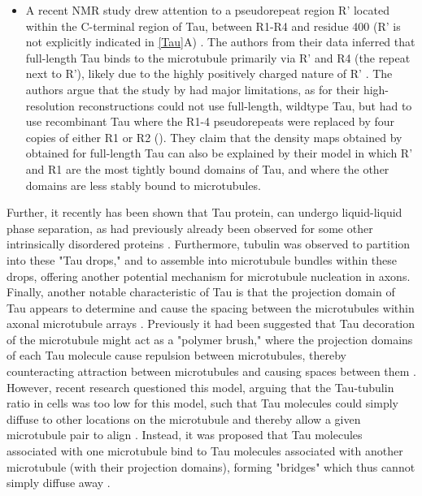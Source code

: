 \begin{itemize}
	\item A recent NMR study drew attention to a pseudorepeat region R' located within the C-terminal region of Tau, between R1-R4 and residue 400 (R' is not explicitly indicated in \autoref{Tau}A) . The authors from their data inferred that full-length Tau binds to the microtubule primarily via R' and R4 (the repeat next to R'), likely due to the highly positively charged nature of R' .  The authors argue that the study by \cite{Kellogg2018} had major limitations, as \cite{Kellogg2018} for their high-resolution reconstructions could not use full-length, wildtype Tau, but had to use recombinant Tau where the R1-4 pseudorepeats were replaced by four copies of either R1 or R2 (\cite{Kellogg2018}). They claim that the density maps obtained by \cite{Kellogg2018} obtained for full-length Tau can also be explained by their model in which R' and R1 are the most tightly bound domains of Tau, and where the other domains are less stably bound to microtubules.
\end{itemize}

Further, it recently has been shown that Tau protein, can undergo liquid-liquid phase separation, as had previously already been observed for some other intrinsically disordered proteins . Furthermore, tubulin was observed to partition into these "Tau drops," and to assemble into microtubule bundles within these drops, offering another potential mechanism for microtubule nucleation in axons. Finally, another notable characteristic of Tau is that the projection domain of Tau appears to determine and cause the spacing between the microtubules within axonal microtubule arrays \parencite{Chen1992}. Previously it had been suggested that Tau decoration of the microtubule might act as a "polymer brush," where the projection domains of each Tau molecule cause repulsion between microtubules, thereby counteracting attraction between microtubules and causing spaces between them . However, recent research questioned this model, arguing that the Tau-tubulin ratio in cells was too low for this model, such that Tau molecules could simply diffuse to other locations on the microtubule and thereby allow a given microtubule pair to align . Instead, it was proposed that Tau molecules associated with one microtubule bind to Tau molecules associated with another microtubule (with their projection domains), forming "bridges" which thus cannot simply diffuse away .\par


